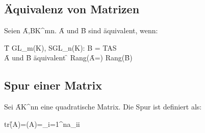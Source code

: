 \subsection{Äquivalenz von Matrizen}
Seien \f{A,B\in K^{m\times n}}. \f{A} und \f{B} sind äquivalent, wenn:
\begin{center}
    \f{\exists T \in GL_m(K), S\in GL_n(K): \quad B = TAS}\\
    \f{A} und \f{B} äquivalent \f{\Leftrightarrow} Rang(\f{A}=) Rang(\f{B})
\end{center}

\subsection{Spur einer Matrix}
Sei \f{A\in K^{n\times n}} eine quadratische Matrix. Die Spur ist definiert als:
\begin{center}
    tr\f{(A)=(A)=\sum_{i=1}^{n}a_{ii}}
\end{center}


